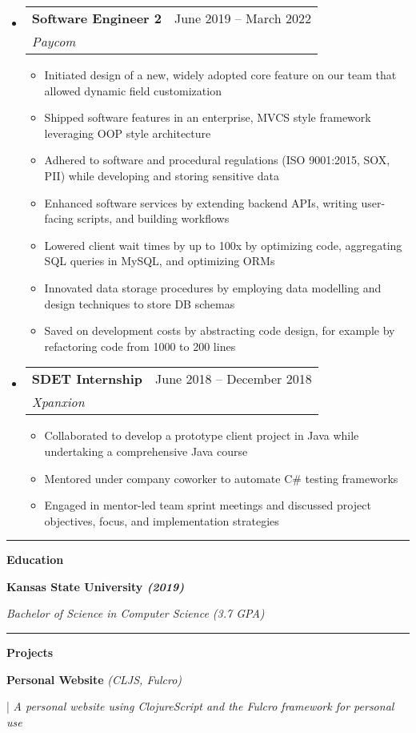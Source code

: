 \documentclass[letterpaper,11pt]{article}
\makeatletter
\newcommand{\resumeItem}[1]{
  \item\small{
    {#1 \vspace{-2pt}}
  }
}
\newcommand{\resumeSubheading}[4]{
  \vspace{-2pt}\item
    \begin{tabular*}{0.97\textwidth}[t]{l@{\extracolsep{\fill}}r}
      \textbf{#1} & #2 \\
      \textit{\small#3} & \textit{\small #4} \\
    \end{tabular*}\vspace{0pt}
}
\newcommand{\resumeSubHeadingListStart}{\begin{itemize}[leftmargin=0.15cm, label={}]}
\newcommand{\resumeSubHeadingListEnd}{\end{itemize}}
\newcommand{\resumeItemListStart}{\begin{itemize}}
\newcommand{\resumeItemListEnd}{\end{itemize}\vspace{-5pt}}
\makeatother
\begin{document}
\resumeSubHeadingListStart
\resumeSubheading
{Software Engineer 2}{June 2019 – March 2022}
{Paycom}{}
\resumeItemListStart
\resumeItem{ Initiated design of a new, widely adopted core feature on our team that allowed dynamic field customization }
\resumeItem{ Shipped software features in an enterprise, MVCS style framework leveraging OOP style architecture}
\resumeItem{ Adhered to software and procedural regulations (ISO 9001:2015, SOX, PII) while developing and storing sensitive data }
\resumeItem{ Enhanced software services by extending backend APIs, writing user-facing scripts, and building workflows }
\resumeItem{ Lowered client wait times by up to 100x by optimizing code, aggregating SQL queries in MySQL, and optimizing ORMs }
\resumeItem{ Innovated data storage procedures by employing data modelling and design techniques to store DB schemas }
\resumeItem{ Saved on development costs by abstracting code design, for example by refactoring code from 1000 to 200 lines }
\resumeItemListEnd
\resumeSubHeadingListEnd
\resumeSubHeadingListStart
\resumeSubheading
{SDET Internship}{June 2018 – December 2018}
{Xpanxion}{}
\resumeItemListStart
\resumeItem{ Collaborated to develop a prototype client project in Java while undertaking a comprehensive Java course }
\resumeItem{ Mentored under company coworker to automate C\# testing frameworks }
\resumeItem{ Engaged in mentor-led team sprint meetings and discussed project objectives, focus, and implementation strategies }
\resumeItemListEnd
\resumeSubHeadingListEnd
\noindent\rule{19.5cm}{0.4pt}

\textbf{\large \textcolor{magic_blue}{Education}}

\begin{minipage}[t]{0.45\textwidth}
    \raggedright
    \textbf{ Kansas State University \textit{(2019)}} \\
\end{minipage}
\hfill
\begin{minipage}[t]{0.45\textwidth}
    \raggedleft
    \textit{Bachelor of Science in Computer Science (3.7 GPA)} \\
\end{minipage}
\noindent\rule{19.5cm}{0.4pt}

\textbf{\large \textcolor{magic_blue}{Projects}}

\begin{minipage}[t]{0.28\textwidth}
    \raggedright
    \textbf{ Personal Website }\textit{(CLJS, Fulcro)} \\
\end{minipage}
\hfill
\begin{minipage}[t]{0.70\textwidth}
    \raggedright
    |\textit{ A personal website using ClojureScript and the Fulcro framework for personal use} \\
\end{minipage}
\end{document}
